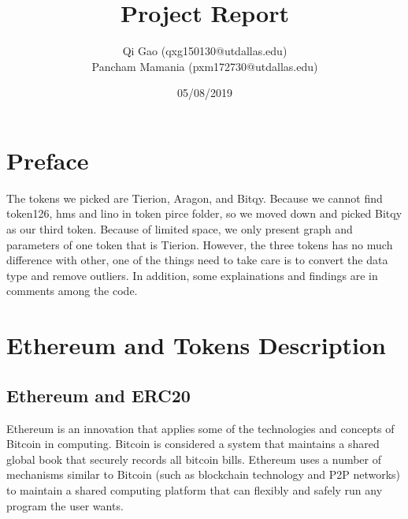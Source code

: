 \documentclass[11pt, letterpaper]{article} %
\title{Project Report} %
\author{
Qi Gao \big(qxg150130@utdallas.edu\big)\\
Pancham Mamania \big(pxm172730@utdallas.edu\big)
  }
\date{05/08/2019} %
\begin{document}

%

\maketitle %


\section*{Preface}
The tokens we picked are Tierion, Aragon, and Bitqy. Because we cannot find token126, hms and lino in token pirce folder, so we moved down and picked Bitqy as our third token. Because of limited space, we only present graph and parameters of one token that is Tierion. However, the three tokens has no much difference with other, one of the things need to take care is to convert the data type and remove outliers. In addition, some explainations and findings are in comments among the code.
\setcounter{page}{1} %
\section{Ethereum and Tokens Description} %
\subsection{Ethereum and ERC20} %
Ethereum is an innovation that applies some of the technologies and concepts of Bitcoin in computing. Bitcoin is considered a system that maintains a shared global book that securely records all bitcoin bills. Ethereum uses a number of mechanisms similar to Bitcoin (such as blockchain technology and P2P networks) to maintain a shared computing platform that can flexibly and safely run any program the user wants.
\end{document}
